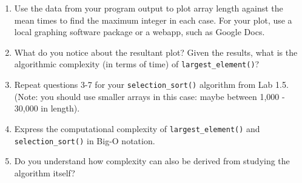 \documentclass[11pt,a4paper]{report}
\begin{document}
\begin{enumerate}
    \item Use the data from your program output to plot array length against the mean times to find the maximum integer in each case. For your plot, use a local graphing software package or a webapp, such as Google Docs.

    \item What do you notice about the resultant plot? Given the results, what is the algorithmic complexity (in terms of time) of \texttt{largest\_element()}?
    
    \item Repeat questions 3-7 for your \texttt{selection\_sort()} algorithm from Lab 1.5. (Note: you should use smaller arrays in this case: maybe between 1,000 - 30,000 in length). 

    \item Express the computational complexity of \texttt{largest\_element()} and \texttt{selection\_sort()} in Big-O notation.

    \item Do you understand how complexity can also be derived from studying the algorithm itself?

\end{enumerate}
\end{document}
